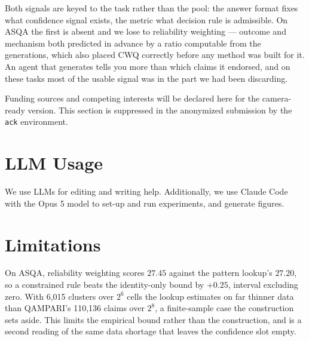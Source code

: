 \documentclass{article}
\begin{document}
Both signals are keyed to the task rather than the pool: the answer format fixes what confidence signal exists, the metric what decision rule is admissible. On ASQA the first is absent and we lose to reliability weighting --- outcome and mechanism both predicted in advance by a ratio computable from the generations, which also placed CWQ correctly before any method was built for it. An agent that generates tells you more than which claims it endorsed, and on these tasks most of the usable signal was in the part we had been discarding.

\begin{ack}
Funding sources and competing interests will be declared here for the camera-ready
version. This section is suppressed in the anonymized submission by the
\texttt{ack} environment.
\end{ack}

%
%


{\small}

\appendix

\section{LLM Usage}

We use LLMs for editing and writing help. Additionally, we use Claude Code with the Opus 5 model to set-up and run experiments, and generate figures.


\section{Limitations}
\label{sec:limitations}

On ASQA, reliability weighting scores $27.45$ against the pattern lookup's $27.20$, so a constrained rule beats the identity-only bound by $+0.25$, interval excluding zero. With 6,015 clusters over $2^6$ cells the lookup estimates on far thinner data than QAMPARI's 110,136 claims over $2^8$, a finite-sample case the construction sets aside. This limits the empirical bound rather than the construction, and is a second reading of the same data shortage that leaves the confidence slot empty. %
\end{document}
